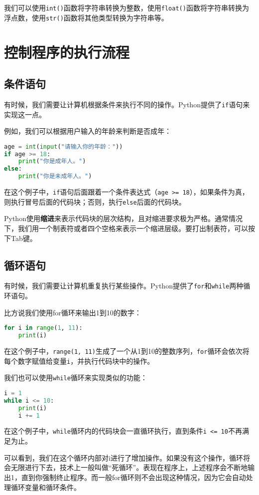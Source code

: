 我们可以使用\texttt{int()}函数将字符串转换为整数，使用\texttt{float()}函数将字符串转换为浮点数，使用\texttt{str()}函数将其他类型转换为字符串等。

\section{控制程序的执行流程}

\subsection{条件语句}

有时候，我们需要让计算机根据条件来执行不同的操作。Python提供了\texttt{if}语句来实现这一点。

例如，我们可以根据用户输入的年龄来判断是否成年：
\begin{lstlisting}[language=python]
age = int(input("请输入你的年龄："))
if age >= 18:
    print("你是成年人。")
else:
    print("你是未成年人。")
\end{lstlisting}
在这个例子中，\texttt{if}语句后面跟着一个条件表达式（\texttt{age >=
18}），如果条件为真，则执行冒号后面的代码块；否则，执行\texttt{else}后面的代码块。

Python使用\textbf{缩进}来表示代码块的层次结构，且对缩进要求极为严格。通常情况下，我们用一个制表符或者四个空格来表示一个缩进层级。要打出制表符，可以按下Tab键。

\subsection{循环语句}

有时候，我们需要让计算机重复执行某些操作。Python提供了\texttt{for}和\texttt{while}两种循环语句。

比方说我们使用for循环来输出1到10的数字：
\begin{lstlisting}[language=python]
for i in range(1, 11):
    print(i)
\end{lstlisting}
在这个例子中，\texttt{range(1,
11)}生成了一个从1到10的整数序列，\texttt{for}循环会依次将每个数字赋值给变量\texttt{i}，并执行代码块中的操作。

我们也可以使用\texttt{while}循环来实现类似的功能：
\begin{lstlisting}[language=python]
i = 1
while i <= 10:
    print(i)
    i += 1
\end{lstlisting}
在这个例子中，\texttt{while}循环内的代码块会一直循环执行，直到条件\texttt{i <= 10}不再满足为止。

可以看到，我们在这个循环内部对i进行了增加操作。如果没有这个操作，循环将会无限进行下去，技术上一般叫做“死循环”。表现在程序上，上述程序会不断地输出1，直到你强制终止程序。而一般for循环则不会出现这种情况，因为它会自动处理循环变量和循环条件。

